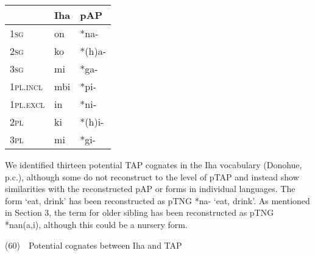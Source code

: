 \begin{center}
\tablehead{}
\begin{supertabular}{|m{0.6941598in}|m{0.33165985in}|m{0.47885987in}|}
\hline
 &
Iha &
pAP\\\hline
\textsc{1sg} &
on &
*na-\\\hline
\textsc{2sg} &
ko &
*(h)a-\\\hline
\textsc{3sg} &
mi &
*ga-\\\hline
\textsc{1pl.incl} &
mbi &
*pi-\\\hline
\textsc{1pl.exc}\textsc{l} &
in &
*ni-\\\hline
\textsc{2pl} &
ki &
*(h)i-\\\hline
\textsc{3pl} &
mi &
*gi-\\\hline
\end{supertabular}
\end{center}
We identified thirteen potential TAP cognates in the Iha vocabulary (Donohue, p.c.), although some do not reconstruct to the level of pTAP and instead show similarities with the reconstructed pAP or forms in individual languages. The form {\textquoteleft}eat, drink{\textquoteright} has been reconstructed as pTNG *na- {\textquoteleft}eat, drink{\textquoteright}. As mentioned in Section 3, the term for older sibling has been reconstructed as pTNG *nan(a,i), although this could be a nursery form. 

(60)\ \ Potential cognates between Iha and TAP

